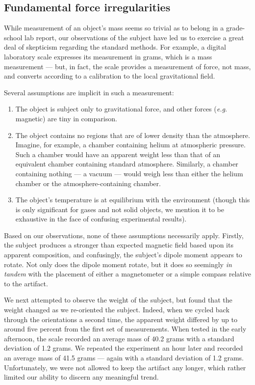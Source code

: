 \documentclass[10pt]{article}
\begin{document}
\subsection{Fundamental force irregularities}
While measurement of an object's mass seems so trivial as to belong in a grade-school lab report, our observations of the subject have led us to exercise a great deal of skepticism regarding the standard methods.
For example, a digital laboratory scale expresses its measurement in grams, which is a mass measurement --- but, in fact, the scale provides a measurement of force, not mass, and converts according to a calibration to the local gravitational field.

Several assumptions are implicit in such a measurement:
\begin{enumerate}
\item The object is subject only to gravitational force, and other forces (\textit{e.g.} magnetic) are tiny in comparison.
\item The object contains no regions that are of lower density than the atmosphere. Imagine, for example, a chamber containing helium at atmospheric pressure. Such a chamber would have an apparent weight less than that of an equivalent chamber containing standard atmosphere. Similarly, a chamber containing nothing --- a vacuum --- would weigh less than either the helium chamber or the atmosphere-containing chamber.
\item The object's temperature is at equilibrium with the environment (though this is only significant for gases and not solid objects, we mention it to be exhaustive in the face of confusing experimental results).
\end{enumerate}

Based on our observations, none of these assumptions necessarily apply.
Firstly, the subject produces a stronger than expected magnetic field based upon its apparent composition, and confusingly, the subject's dipole moment appears to rotate.
Not only does the dipole moment rotate, but it does so seemingly \textit{in tandem} with the placement of either a magnetometer or a simple compass relative to the artifact.

We next attempted to observe the weight of the subject, but found that the weight changed as we re-oriented the subject.
Indeed, when we cycled back through the orientations a second time, the apparent weight differed by up to around five percent from the first set of measurements.
When tested in the early afternoon, the scale recorded an average mass of 40.2 grams with a standard deviation of 1.2 grams.
We repeated the experiment an hour later and recorded an average mass of 41.5 grams --- again with a standard deviation of 1.2 grams.
Unfortunately, we were not allowed to keep the artifact any longer, which rather limited our ability to discern any meaningful trend.
\end{document}
